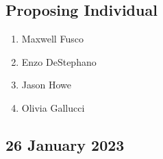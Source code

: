 \begin{enumerate}
            \subsection{Proposing Individual}
            \begin{enumerate}
                  \item Maxwell Fusco
                  \item Enzo DeStephano
                  \item Jason Howe
                  \item Olivia Gallucci
            \end{enumerate}
\end{enumerate}

\subsection{26 January 2023}
